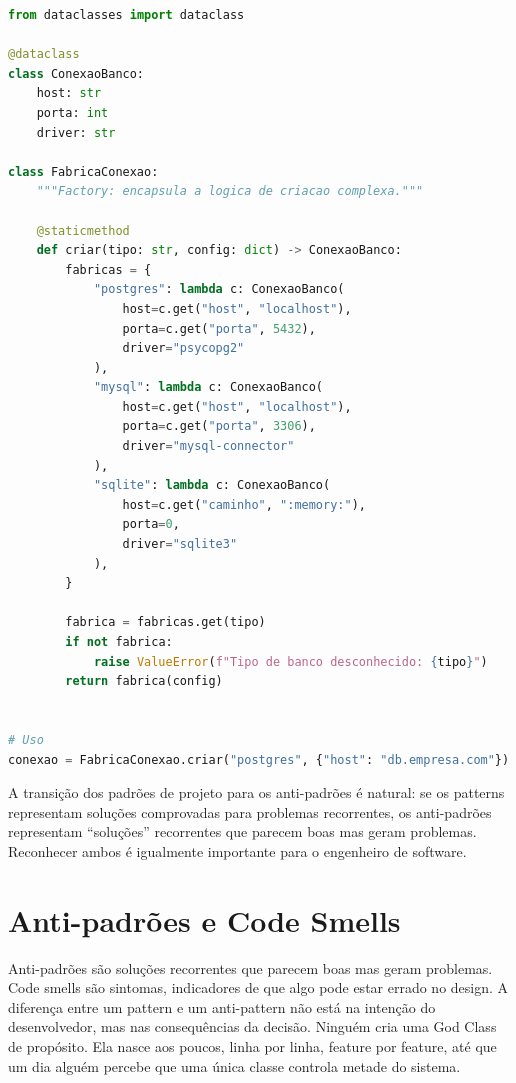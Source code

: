 \begin{lstlisting}[language=Python, caption={Factory Pattern em Python}]
from dataclasses import dataclass

@dataclass
class ConexaoBanco:
    host: str
    porta: int
    driver: str

class FabricaConexao:
    """Factory: encapsula a logica de criacao complexa."""

    @staticmethod
    def criar(tipo: str, config: dict) -> ConexaoBanco:
        fabricas = {
            "postgres": lambda c: ConexaoBanco(
                host=c.get("host", "localhost"),
                porta=c.get("porta", 5432),
                driver="psycopg2"
            ),
            "mysql": lambda c: ConexaoBanco(
                host=c.get("host", "localhost"),
                porta=c.get("porta", 3306),
                driver="mysql-connector"
            ),
            "sqlite": lambda c: ConexaoBanco(
                host=c.get("caminho", ":memory:"),
                porta=0,
                driver="sqlite3"
            ),
        }

        fabrica = fabricas.get(tipo)
        if not fabrica:
            raise ValueError(f"Tipo de banco desconhecido: {tipo}")
        return fabrica(config)


# Uso
conexao = FabricaConexao.criar("postgres", {"host": "db.empresa.com"})
\end{lstlisting}

A transição dos padrões de projeto para os anti-padrões é natural: se os
patterns representam soluções comprovadas para problemas recorrentes, os
anti-padrões representam ``soluções'' recorrentes que parecem boas mas
geram problemas. Reconhecer ambos é igualmente importante para o engenheiro
de software.


\section{Anti-padrões e Code Smells}

Anti-padrões são soluções recorrentes que parecem boas mas geram problemas. Code
smells são sintomas, indicadores de que algo pode estar errado no design.
A diferença entre um pattern e um anti-pattern não está na intenção do
desenvolvedor, mas nas consequências da decisão. Ninguém cria uma God Class
de propósito. Ela nasce aos poucos, linha por linha, feature por feature, até
que um dia alguém percebe que uma única classe controla metade do sistema.

